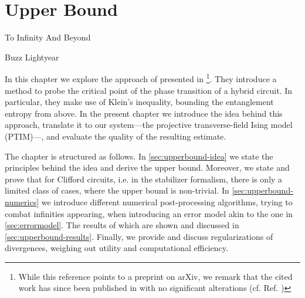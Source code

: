 \chapter{Upper Bound}
\label{ch:rel-ent}
\epigraph{To Infinity And Beyond}{Buzz Lightyear}

%
In this chapter we explore the approach of
\citeauthor{garrattProbingPostmeasurementEntanglement2023} presented in
\cite{garrattProbingPostmeasurementEntanglement2023}\footnote{While this
  reference points to a preprint on arXiv, we remark that the cited work has
since been published in
 with no
significant alterations (cf. Ref.
\cite{garrattProbingPostmeasurementEntanglement2024})}. They introduce a method
to probe the critical point of the phase transition of a hybrid circuit. In
particular, they make use of Klein's inequality, bounding the entanglement
entropy from above. In the present chapter we introduce the idea behind this
approach, translate it to our system---the projective transverse-field Ising
model (PTIM)---, and evaluate the quality of the resulting estimate. 

The chapter is structured as follows. In \cref{sec:upperbound-idea} we state
the principles behind the idea and derive the upper bound. Moreover, we state
and prove that for Clifford circuits, i.e. in the stabilizer formalism, there
is only a limited class of cases, where the upper bound is non-trivial. In
\cref{sec:upperbound-numerics} we introduce different numerical post-processing
algorithms, trying to combat infinities appearing, when introducing an error
model akin to the one in \cref{sec:errormodel}. The results of which are shown
and discussed in \cref{sec:upperbound-results}. Finally, we provide and discuss
regularizations of divergences, weighing out utility and computational
efficiency.

%
%
\clearpage
